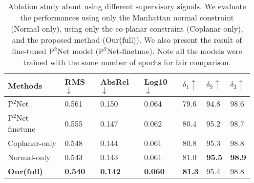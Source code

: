 \documentclass[10pt,twocolumn,letterpaper]{article}
\begin{document}
\begin{table}[ht]
	\scriptsize
	\centering
	\begin{tabularx}{0.48\textwidth}{|l|XXX|XXX|}
		\hline                                                    
		Methods &  RMS$\downarrow$ & AbsRel$\downarrow$ & Log10$\downarrow$ & $\delta_1\uparrow$ & $\delta_2\uparrow$ & $\delta_3\uparrow$ \\
		\hline
		P$^2$Net\cite{yu2020p} & 0.561 & 0.150 & 0.064 & 79.6  & 94.8  & 98.6 \\
		\hline
		\hline
		P$^2$Net-finetune & 0.555 & 0.147 & 0.062 & 80.4  & 95.2  & 98.7 \\
		
Coplanar-only & 0.548 & 0.144  & 0.061 & 80.8  & 95.3  & 98.8 \\
		
Normal-only & 0.543 & 0.143 & 0.061 & 81.0 & \textbf{95.5}  & \textbf{98.9} \\
		
\textbf{Our(full)} & \textbf{0.540} & \textbf{0.142} & 
		\textbf{0.060} & \textbf{81.3}  & 95.4  & 98.8 \\
		\hline
	\end{tabularx}\newline
	\caption{Ablation study about using different supervisory signals. 
We evaluate the performances using only the Manhattan normal constraint (Normal-only), using only the co-planar constraint (Coplanar-only), and the proposed method (Our(full)). We also present the result of fine-tuned P$^2$Net model (P$^2$Net-finetune). Note all the models were trained with the same number of epochs for fair comparison. }
	\label{tab:ablation}\end{table}
\end{document}
